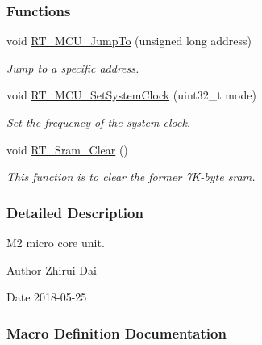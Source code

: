 \subsubsection*{Functions}
\begin{DoxyCompactItemize}
\item 
void \mbox{\hyperlink{a00020_aa106e3c9181a65a83156bda31f4f61e9}{R\+T\+\_\+\+M\+C\+U\+\_\+\+Jump\+To}} (unsigned long address)
\begin{DoxyCompactList}\small\item\em Jump to a specific address. \end{DoxyCompactList}\item 
void \mbox{\hyperlink{a00020_a1e578ce669735935a1d505c0edf98221}{R\+T\+\_\+\+M\+C\+U\+\_\+\+Set\+System\+Clock}} (uint32\+\_\+t mode)
\begin{DoxyCompactList}\small\item\em Set the frequency of the system clock. \end{DoxyCompactList}\item 
void \mbox{\hyperlink{a00020_ad514417aa2e5a5d061a5eabeceae20c6}{R\+T\+\_\+\+Sram\+\_\+\+Clear}} ()
\begin{DoxyCompactList}\small\item\em This function is to clear the former 7\+K-\/byte sram. \end{DoxyCompactList}\end{DoxyCompactItemize}


\subsubsection{Detailed Description}
M2 micro core unit. 

\begin{DoxyAuthor}{Author}
Zhirui Dai 
\end{DoxyAuthor}
\begin{DoxyDate}{Date}
2018-\/05-\/25 
\end{DoxyDate}


\subsubsection{Macro Definition Documentation}
\mbox{\label{a00020_a9bbaf5b9e2125c7597249c7113b20e6c}} 

